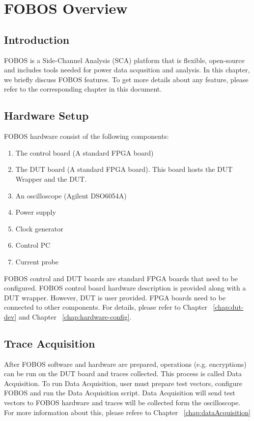 \chapter{FOBOS Overview}
\section{Introduction}
FOBOS is a Side-Channel Analysis (SCA) platform  that is flexible, open-source and includes tools needed for power data acqusition and analysis.
In this chapter, we briefly discuss FOBOS features. To get more details about any feature, please refer to the corresponding chapter in this document.

\section{Hardware Setup}
FOBOS hardware consist of the following components:
\begin{enumerate}
  \item The control board (A standard FPGA board)
  \item The DUT board (A standard FPGA board). This board hosts the DUT Wrapper and the DUT.
  \item An oscilloscope (Agilent DSO6054A) 
  \item Power supply 
  \item Clock generator
  \item Control PC
  \item Current probe
\end{enumerate}

FOBOS control and DUT boards are standard FPGA boards that need to be configured. FOBOS control board hardware description is provided along with a DUT wrapper. However, DUT is user provided.
FPGA boards need to be connected to other components. For details, please refer to Chapter~ \ref{chap:dut-dev} and Chapter~ \ref{chap:hardware-config}.

\section{Trace Acquisition}
After FOBOS software and hardware are prepared, operations (e.g. encryptions) can be run on the DUT board and traces collected.
This process is called Data Acquisition.
To run Data Acquisition, user must prepare test vectors, configure FOBOS and run the Data Acquisition script.
Data Acquisition will send test vectors to FOBOS hardware and traces will be collected form the oscilloscope. For more information about this, please refere to Chapter~ \ref{chap:dataAcquisition}
 
